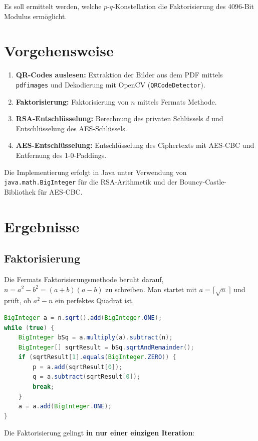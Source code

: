 \documentclass[
    fontsize=12pt,          %
    paper=a4,               %
    numbers=noenddot,       %
    listof=totoc,           %
    listof=entryprefix,     %
    listof=nochaptergap,    %
    bibliography=totoc,     %
    parskip=half,           %
    openany                 %
]{scrbook}
\begin{document}
Es soll ermittelt werden, welche $p$-$q$-Konstellation die Faktorisierung des 4096-Bit Modulus ermöglicht.


\section*{Vorgehensweise}

\begin{enumerate}
    \item \textbf{QR-Codes auslesen:} Extraktion der Bilder aus dem PDF mittels \texttt{pdfimages} und Dekodierung mit OpenCV (\texttt{QRCodeDetector}).
    \item \textbf{Faktorisierung:} Faktorisierung von $n$ mittels Fermats Methode.
    \item \textbf{RSA-Entschlüsselung:} Berechnung des privaten Schlüssels $d$ und Entschlüsselung des AES-Schlüssels.
    \item \textbf{AES-Entschlüsselung:} Entschlüsselung des Ciphertexts mit AES-CBC und Entfernung des 1-0-Paddings.
\end{enumerate}

Die Implementierung erfolgt in Java unter Verwendung von \texttt{java.math.BigInteger} für die RSA-Arithmetik und der Bouncy-Castle-Bibliothek für AES-CBC.


\section*{Ergebnisse}


\subsection*{Faktorisierung}

Die Fermats Faktorisierungsmethode beruht darauf, $n = a^2 - b^2 = (a+b)(a-b)$ zu schreiben.
Man startet mit $a = \lceil\sqrt{n}\,\rceil$ und prüft, ob $a^2 - n$ ein perfektes Quadrat ist.

\begin{lstlisting}[language=Java, caption={Fermat-Faktorisierung}]
BigInteger a = n.sqrt().add(BigInteger.ONE);
while (true) {
    BigInteger bSq = a.multiply(a).subtract(n);
    BigInteger[] sqrtResult = bSq.sqrtAndRemainder();
    if (sqrtResult[1].equals(BigInteger.ZERO)) {
        p = a.add(sqrtResult[0]);
        q = a.subtract(sqrtResult[0]);
        break;
    }
    a = a.add(BigInteger.ONE);
}
\end{lstlisting}

Die Faktorisierung gelingt \textbf{in nur einer einzigen Iteration}:
\end{document}
